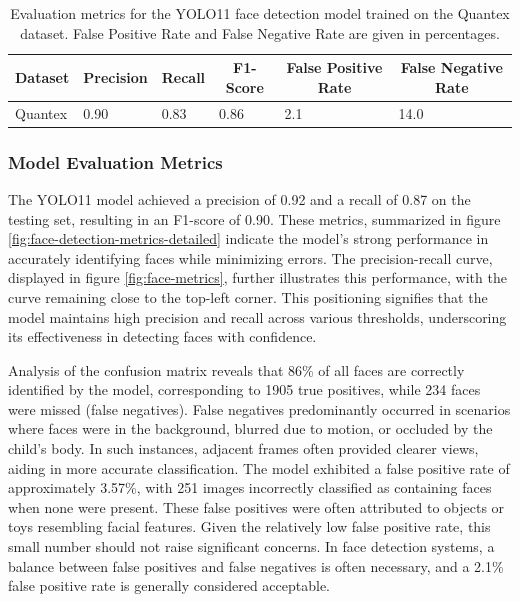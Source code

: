 \documentclass[
  man,floatsintext]{apa6}
\begin{document}
\begin{table}[tbp]

\begin{center}
\begin{threeparttable}

\caption{\label{tab:face-detection-metrics-detailed}Evaluation metrics for the YOLO11 face detection model trained on the Quantex dataset. False Positive Rate and False Negative Rate are given in percentages.}

\begin{tabular}{llllll}
\toprule
Dataset & \multicolumn{1}{c}{Precision} & \multicolumn{1}{c}{Recall} & \multicolumn{1}{c}{F1-Score} & \multicolumn{1}{c}{False Positive Rate} & \multicolumn{1}{c}{False Negative Rate}\\
\midrule
Quantex & 0.90 & 0.83 & 0.86 & 2.1 & 14.0\\
\bottomrule
\end{tabular}

\end{threeparttable}
\end{center}

\end{table}

\subsubsection{Model Evaluation Metrics}\label{model-evaluation-metrics}

The YOLO11 model achieved a precision of 0.92 and a recall of 0.87 on the testing set, resulting in an F1-score of 0.90. These metrics, summarized in figure \ref{fig:face-detection-metrics-detailed} indicate the model's strong performance in accurately identifying faces while minimizing errors. The precision-recall curve, displayed in figure \ref{fig:face-metrics}, further illustrates this performance, with the curve remaining close to the top-left corner. This positioning signifies that the model maintains high precision and recall across various thresholds, underscoring its effectiveness in detecting faces with confidence.

Analysis of the confusion matrix reveals that 86\% of all faces are correctly identified by the model, corresponding to 1905 true positives, while 234 faces were missed (false negatives). False negatives predominantly occurred in scenarios where faces were in the background, blurred due to motion, or occluded by the child's body. In such instances, adjacent frames often provided clearer views, aiding in more accurate classification. The model exhibited a false positive rate of approximately 3.57\%, with 251 images incorrectly classified as containing faces when none were present. These false positives were often attributed to objects or toys resembling facial features. Given the relatively low false positive rate, this small number should not raise significant concerns. In face detection systems, a balance between false positives and false negatives is often necessary, and a 2.1\% false positive rate is generally considered acceptable.
\end{document}
